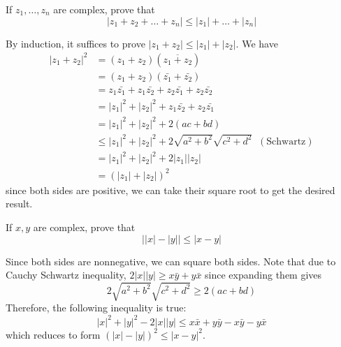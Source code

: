   \begin{exercise}[Rudin 1.12]
    If $z_1, \ldots, z_n$ are complex, prove that
    \begin{equation}
      |z_1 + z_2 + \ldots + z_n| \leq |z_1| + \ldots + |z_n|
    \end{equation}
  \end{exercise}
  \begin{solution}
    By induction, it suffices to prove $|z_1 + z_2| \leq |z_1| + |z_2|$. We have 
    \begin{align*}
      |z_1 + z_2|^2 & = (z_1 + z_2) (\overline{z_1 + z_2}) \\
      & = (z_1 + z_2) (\bar{z_1} + \bar{z_2}) \\ 
      & = z_1 \bar{z_1} + z_1 \bar{z_2} + z_2 \bar{z_1} + z_2 \bar{z_2} \\
      & = |z_1|^2 + |z_2|^2 + z_1 \bar{z_2} + z_2 \bar{z_1} \\
      & = |z_1|^2 + |z_2|^2 + 2 (a c + bd) \\
      & \leq |z_1|^2 + |z_2|^2 + 2 \sqrt{a^2 + b^2} \sqrt{c^2 + d^2} \;\; (\text{Schwartz}) \\
      & = |z_1|^2 + |z_2|^2 + 2 |z_1| |z_2| \\
      & = (|z_1| + |z_2|)^2
    \end{align*}
    since both sides are positive, we can take their square root to get the desired result. 
  \end{solution}

  \begin{exercise}[Rudin 1.13]
    If $x, y$ are complex, prove that 
    \begin{equation}
      \big| |x| - |y| \big| \leq |x - y|
    \end{equation}
  \end{exercise}
  \begin{solution}
    Since both sides are nonnegative, we can square both sides. Note that due to Cauchy Schwartz inequality, $2|x| |y| \geq x \bar{y} + y \bar{x}$ since expanding them gives 
    \begin{equation}
      2 \sqrt{a^2 + b^2} \sqrt{c^2 + d^2} \geq 2 (ac + bd)
    \end{equation}
    Therefore, the following inequality is true: 
    \begin{equation}
      |x|^2 + |y|^2 - 2 |x| |y| \leq x \bar{x} + y \bar{y} - x \bar{y} - y \bar{x}
    \end{equation}
    which reduces to form $(|x| - |y|)^2 \leq |x - y|^2$. 
  \end{solution}

